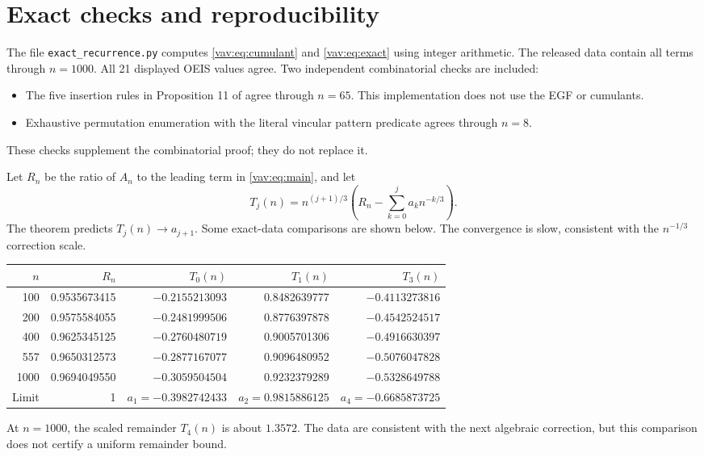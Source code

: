 \documentclass[11pt]{article}
\theoremstyle{remark}\newtheorem{remark}[theorem]{Remark}
\begin{document}
\section{Exact checks and reproducibility}\label{vav:sec:checks}

The file \texttt{exact\_recurrence.py} computes \eqref{vav:eq:cumulant}
and \eqref{vav:eq:exact} using integer arithmetic. The released data
contain all terms through $n=1000$. All 21 displayed OEIS values agree.
Two independent combinatorial checks are included:
\begin{itemize}
\item The five insertion rules in Proposition 11 of \cite{bck} agree
through $n=65$. This implementation does not use the EGF or cumulants.
\item Exhaustive permutation enumeration with the literal vincular
pattern predicate agrees through $n=8$.
\end{itemize}
These checks supplement the combinatorial proof; they do not replace it.

Let $R_n$ be the ratio of $A_n$ to the leading term in
\eqref{vav:eq:main}, and let
\[
 T_j(n)=n^{(j+1)/3}\left(R_n-\sum_{k=0}^ja_kn^{-k/3}\right).
\]
The theorem predicts $T_j(n)\to a_{j+1}$. Some exact-data comparisons
are shown below. The convergence is slow, consistent with the
$n^{-1/3}$ correction scale.
\begin{center}
\begin{tabular}{rrrrr}
\toprule
$n$ & $R_n$ & $T_0(n)$ & $T_1(n)$ & $T_3(n)$\\\midrule
100 & 0.9535673415 & $-0.2155213093$ & 0.8482639777 & $-0.4113273816$\\
200 & 0.9575584055 & $-0.2481999506$ & 0.8776397878 & $-0.4542524517$\\
400 & 0.9625345125 & $-0.2760480719$ & 0.9005701306 & $-0.4916630397$\\
557 & 0.9650312573 & $-0.2877167077$ & 0.9096480952 & $-0.5076047828$\\
1000 & 0.9694049550 & $-0.3059504504$ & 0.9232379289 & $-0.5328649788$\\\midrule
Limit & 1 & $a_1=-0.3982742433$ & $a_2=0.9815886125$ & $a_4=-0.6685873725$\\
\bottomrule
\end{tabular}
\end{center}
At $n=1000$, the scaled remainder $T_4(n)$ is about $1.3572$.
The data are consistent with the next algebraic correction, but this
comparison does not certify a uniform remainder bound.
\end{document}
